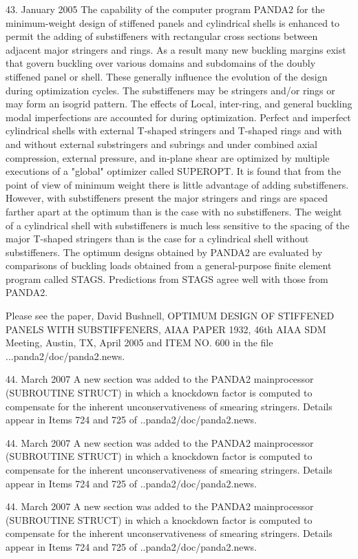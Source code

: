 43. January 2005
The capability of the computer program PANDA2 for the minimum-weight design
of stiffened panels and cylindrical shells is enhanced to permit the
adding of substiffeners with rectangular cross sections between adjacent major
stringers and rings. As a result many new buckling margins exist that
govern buckling over various domains and subdomains of the doubly stiffened
panel or shell. These generally influence the evolution of the design during
optimization cycles. The substiffeners may be stringers and/or rings or may
form an isogrid pattern. The effects of Local, inter-ring, and general buckling
modal imperfections are accounted for during optimization. Perfect and
imperfect cylindrical shells with external T-shaped stringers and T-shaped
rings and with and without external substringers and subrings and under combined
axial compression, external pressure, and in-plane shear are optimized
by multiple executions of a "global" optimizer called SUPEROPT. It is found
that from the point of view of minimum weight there is little advantage of
adding substiffeners. However, with substiffeners present the major stringers
and rings are spaced farther apart at the optimum than is the case with
no substiffeners. The weight of a cylindrical shell with substiffeners is much
less sensitive to the spacing of the major T-shaped stringers than is the case
for a cylindrical shell without substiffeners. The optimum designs obtained
by PANDA2 are evaluated by comparisons of buckling loads obtained from a
general-purpose finite element program called STAGS. Predictions from STAGS
agree well with those from PANDA2.

Please see the paper,  David Bushnell, OPTIMUM DESIGN OF STIFFENED PANELS WITH
SUBSTIFFENERS, AIAA PAPER 1932, 46th AIAA SDM Meeting, Austin, TX, April 2005
and ITEM NO. 600 in the file ...panda2/doc/panda2.news.

44. March 2007
A new section was added to the PANDA2 mainprocessor (SUBROUTINE STRUCT) in
which a knockdown factor is computed to compensate for the inherent
unconservativeness of smearing stringers. Details appear in Items 724 and
725 of ..panda2/doc/panda2.news.

44. March 2007
A new section was added to the PANDA2 mainprocessor (SUBROUTINE STRUCT) in
which a knockdown factor is computed to compensate for the inherent
unconservativeness of smearing stringers. Details appear in Items 724 and
725 of ..panda2/doc/panda2.news.

44. March 2007
A new section was added to the PANDA2 mainprocessor (SUBROUTINE STRUCT) in
which a knockdown factor is computed to compensate for the inherent
unconservativeness of smearing stringers. Details appear in Items 724 and
725 of ..panda2/doc/panda2.news.

